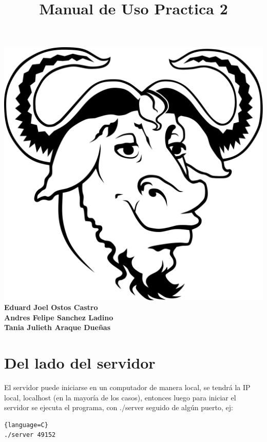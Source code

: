 \documentclass{article}
\title{Manual de Uso Practica 2}
\begin{document}
\maketitle
\begin{center}
  \includegraphics[scale=0.2]{gnu}\\
  \vspace{3cm}
  \textbf{Eduard Joel Ostos Castro}\\
  \textbf{Andres Felipe Sanchez Ladino}\\ 
  \textbf{Tania Julieth Araque Dueñas}\\ 
\end{center}

\newpage
{}

\section{Del lado del servidor}
El servidor puede iniciarse en un computador de manera local, se tendrá la IP local, localhost (en la mayoría de los casos), entonces luego para iniciar el servidor se ejecuta el programa, con ./server seguido de algún puerto, ej:
\begin{lstlisting}{language=C}
./server 49152
\end{lstlisting}
\end{document}
